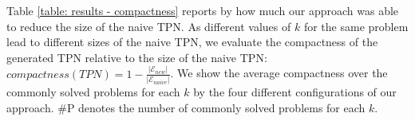 Table \ref{table: results - compactness} reports by how much our approach was able to reduce the size 
of the naive TPN. As different values of $k$ for the same problem lead to different sizes of the naive TPN, 
we evaluate the compactness of the generated TPN relative to the size of the naive 
TPN: $compactness(TPN) = 1 - \frac{|\mathcal{E}_{new}|}{|\mathcal{E}_{naive}|}$. 
We show the average compactness over the commonly solved problems for each $k$ by the four different 
configurations of our approach. \#P denotes the number of commonly solved problems for each $k$.












